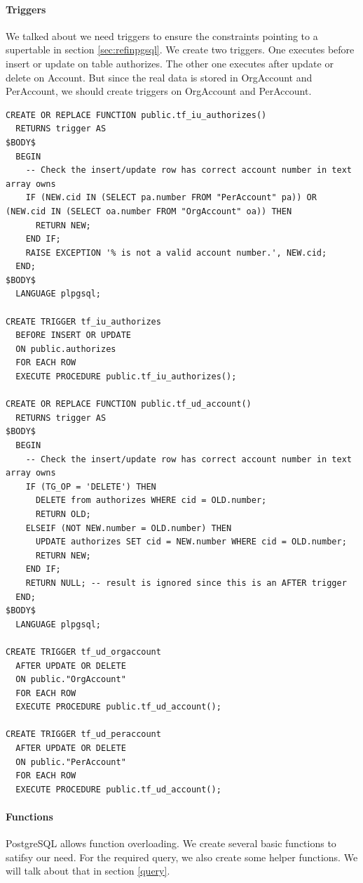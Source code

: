 \documentclass[11pt]{article}
\begin{document}
\paragraph{Triggers}
\par
We talked about we need triggers to ensure the constraints pointing to a supertable in section \ref{sec:refinpgsql}. We create two triggers. One executes before insert or update on table authorizes. The other one executes after update or delete on Account. But since the real data is stored in OrgAccount and PerAccount, we should create triggers on OrgAccount and PerAccount.

\begin{verbatim}
CREATE OR REPLACE FUNCTION public.tf_iu_authorizes()
  RETURNS trigger AS
$BODY$
  BEGIN
    -- Check the insert/update row has correct account number in text array owns
    IF (NEW.cid IN (SELECT pa.number FROM "PerAccount" pa)) OR (NEW.cid IN (SELECT oa.number FROM "OrgAccount" oa)) THEN
      RETURN NEW;
    END IF;
    RAISE EXCEPTION '% is not a valid account number.', NEW.cid;
  END;
$BODY$
  LANGUAGE plpgsql;

CREATE TRIGGER tf_iu_authorizes
  BEFORE INSERT OR UPDATE
  ON public.authorizes
  FOR EACH ROW
  EXECUTE PROCEDURE public.tf_iu_authorizes();

CREATE OR REPLACE FUNCTION public.tf_ud_account()
  RETURNS trigger AS
$BODY$
  BEGIN
    -- Check the insert/update row has correct account number in text array owns
    IF (TG_OP = 'DELETE') THEN
      DELETE from authorizes WHERE cid = OLD.number;
      RETURN OLD;
    ELSEIF (NOT NEW.number = OLD.number) THEN
      UPDATE authorizes SET cid = NEW.number WHERE cid = OLD.number;
      RETURN NEW;
    END IF;
    RETURN NULL; -- result is ignored since this is an AFTER trigger
  END;
$BODY$
  LANGUAGE plpgsql;

CREATE TRIGGER tf_ud_orgaccount
  AFTER UPDATE OR DELETE
  ON public."OrgAccount"
  FOR EACH ROW
  EXECUTE PROCEDURE public.tf_ud_account();

CREATE TRIGGER tf_ud_peraccount
  AFTER UPDATE OR DELETE
  ON public."PerAccount"
  FOR EACH ROW
  EXECUTE PROCEDURE public.tf_ud_account();
\end{verbatim}

\paragraph{Functions} PostgreSQL allows function overloading. We create several basic functions to satifsy our need. For the required query, we also create some helper functions. We will talk about that in section \ref{query}.
\end{document}
